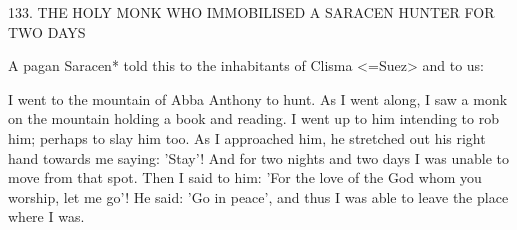 133.
THE HOLY MONK WHO IMMOBILISED A
SARACEN HUNTER FOR TWO DAYS

A pagan Saracen* told this to the inhabitants of Clisma <=Suez>
and to us:

I went to the mountain of Abba Anthony to hunt.
As I went along,
I saw a monk on the mountain holding a book and reading.
I went
up to him intending to rob him; perhaps to slay him too.
As I
approached him, he stretched out his right hand towards me saying:
'Stay'! And for two nights and two days I was unable to move from
that spot.
Then I said to him: 'For the love of the God whom you
worship, let me go'! He said: 'Go in peace', and thus I was able to
leave the place where I was.

